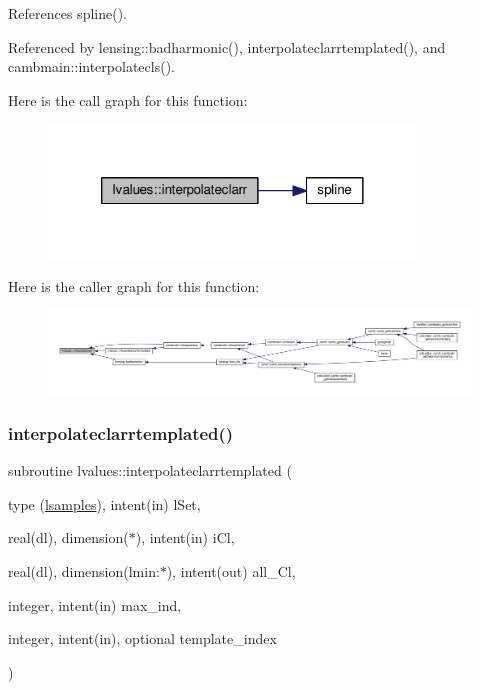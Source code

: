 References spline().



Referenced by lensing\+::badharmonic(), interpolateclarrtemplated(), and cambmain\+::interpolatecls().

Here is the call graph for this function\+:
\nopagebreak
\begin{figure}[H]
\begin{center}
\leavevmode
\includegraphics[width=276pt]{namespacelvalues_a62105cb97d67654d96481cbb8fe54240_cgraph}
\end{center}
\end{figure}
Here is the caller graph for this function\+:
\nopagebreak
\begin{figure}[H]
\begin{center}
\leavevmode
\includegraphics[width=350pt]{namespacelvalues_a62105cb97d67654d96481cbb8fe54240_icgraph}
\end{center}
\end{figure}
\mbox{\label{namespacelvalues_a0aa80e0b1f26674e19df96ec0d9c199e}} 
\subsubsection{\texorpdfstring{interpolateclarrtemplated()}{interpolateclarrtemplated()}}
{\footnotesize\ttfamily subroutine lvalues\+::interpolateclarrtemplated (\begin{DoxyParamCaption}\item[{type (\mbox{\hyperlink{structlvalues_1_1lsamples}{lsamples}}), intent(in)}]{l\+Set,  }\item[{real(dl), dimension($\ast$), intent(in)}]{i\+Cl,  }\item[{real(dl), dimension(lmin\+:$\ast$), intent(out)}]{all\+\_\+\+Cl,  }\item[{integer, intent(in)}]{max\+\_\+ind,  }\item[{integer, intent(in), optional}]{template\+\_\+index }\end{DoxyParamCaption})}



